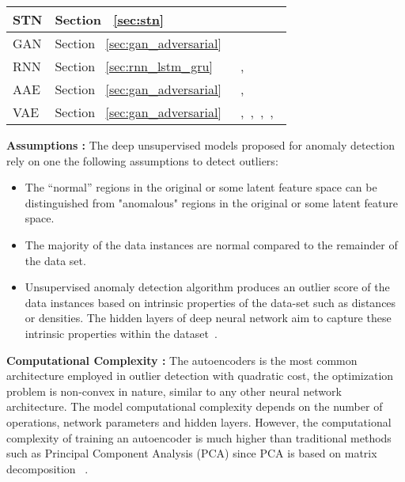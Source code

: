 \begin{table*}
\begin{center}
{\begin{tabular}{ | p{3cm}  | p{2cm} | p{8cm} |}
     STN & Section ~\ref{sec:stn} & ~\cite{chianucci2016unsupervised}\\\hline
     GAN & Section ~\ref{sec:gan_adversarial} & ~\cite{lawson2017finding} \\\hline
     RNN & Section ~\ref{sec:rnn_lstm_gru} & ~\cite{dasigi2014modeling},\cite{filonov2017rnn} \\\hline
     AAE & Section ~\ref{sec:gan_adversarial} & ~\cite{dimokranitou2017adversarial},~\cite{leveau2017adversarial} \\\hline
     VAE & Section ~\ref{sec:gan_adversarial} &  ~\cite{an2015variational},~\cite{suh2016echo},~\cite{solch2016variational},~\cite{xu2018unsupervised},~\cite{mishra2017generative}\\\hline
    \end{tabular}}
\end{center}
\end{table*}


\textbf{Assumptions : } 
The deep unsupervised models proposed for anomaly detection rely on one the following assumptions to detect outliers:
\begin{itemize}
 \item The “normal” regions in the original or some latent feature space can be distinguished from "anomalous" regions in the original or some latent feature space.
  \item The majority of the data instances are normal compared to the remainder of the data set.
  \item Unsupervised anomaly detection algorithm produces an outlier score of the data instances based on  intrinsic properties of the data-set such as distances or densities. The hidden layers of deep neural network aim to capture these intrinsic properties within the dataset~\cite{goldstein2016comparative}.
\end{itemize}

\textbf{Computational Complexity :} 
The autoencoders is the most common architecture employed in outlier detection with quadratic cost, the optimization problem is non-convex in nature, similar to any other neural network architecture.
The model computational complexity depends on the number of operations, network parameters and hidden layers. However, the computational complexity of training an autoencoder is much higher than traditional methods such as Principal Component Analysis (PCA) since PCA is
based on matrix decomposition ~\cite{meng2018relational,parchami2017using}.\\

